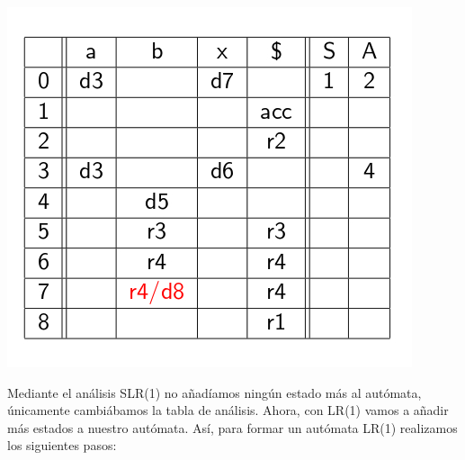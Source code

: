 \documentclass{apuntes}
\begin{document}
\begin{example}
\begin{center}
\includegraphics[scale=0.4]{img/tablaanalisisslr1c1.jpg}
\end{center}
\end{example}

Mediante el análisis SLR(1) no añadíamos ningún estado más al autómata, únicamente cambiábamos la tabla de análisis. Ahora, con LR(1) vamos a añadir más estados a nuestro autómata. Así, para formar un autómata LR(1) realizamos los siguientes pasos:
\end{document}
